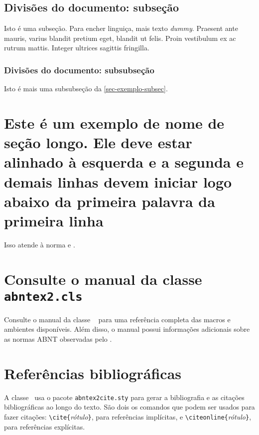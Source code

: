 \subsection{Divisões do documento: subseção}\label{sec-exemplo-subsec}

Isto é uma subseção. Para encher linguiça, mais texto \emph{dummy}. 
Praesent ante mauris, varius blandit pretium eget, blandit ut felis. 
Proin vestibulum ex ac rutrum mattis. Integer ultrices sagittis 
fringilla.

\subsubsection{Divisões do documento: subsubseção}

Isto é mais uma subsubseção da \autoref{sec-exemplo-subsec}.

\section{Este é um exemplo de nome de seção longo. Ele deve estar
alinhado à esquerda e a segunda e demais linhas devem iniciar logo abaixo da
primeira palavra da primeira linha}

Isso atende à norma  
 e .


\section{Consulte o manual da classe \texttt{abntex2.cls}}

Consulte o manual da classe \abnTeX\  \cite{abntex2classe} para uma
referência completa das macros e ambientes disponíveis. Além disso, o manual
possui informações adicionais sobre as normas ABNT observadas pelo \abnTeX.
 
\section{Referências bibliográficas}

A classe \abnTeX\ usa o pacote \texttt{abntex2cite.sty} para gerar a
bibliografia e as citações bibliográficas ao longo do texto. São dois
os comandos que podem ser usados para fazer citações: 
\verb|\cite{|\emph{rótulo}\verb|}|, para referências implícitas, e 
\verb|\citeonline{|\emph{rótulo}\verb|}|, para referências explícitas.

